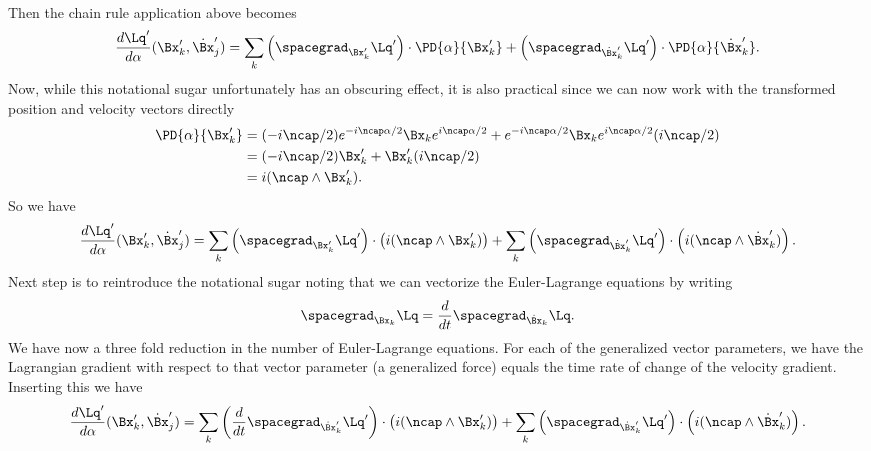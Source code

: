 {\begin{equation}
\begin{aligned}
\end{aligned}
\end{equation}
%
Then the chain rule application above becomes
%
\begin{equation}\label{eqn:goldsteinCh12:420}
\frac{d \Lq'}{d\alpha} (\Bx_k', \dot{\Bx}_j')
= \sum_{k} \left( \spacegrad_{\Bx_k'} \Lq'\right) \cdot \PD{\alpha}{\Bx_k'} + \left( \spacegrad_{\dot{\Bx}_k'} \Lq' \right) \cdot \PD{\alpha}{\dot{\Bx}_k'} .
\end{equation}
%
Now, while this notational sugar unfortunately has an obscuring effect, it is also practical since we can now work with the transformed position
and velocity vectors directly
%
\begin{equation}\label{eqn:goldsteinCh12:440}
\begin{aligned}
\PD{\alpha}{\Bx_k'}
&= (-i \ncap/2) e^{-i\ncap \alpha/2} {\Bx}_k e^{i\ncap\alpha/2} +e^{-i\ncap \alpha/2} {\Bx}_k e^{i\ncap\alpha/2} (i \ncap/2)  \\
&= (-i \ncap/2) \Bx_k' + \Bx_k' (i \ncap/2) \\
&= i (\ncap \wedge \Bx_k').
\end{aligned}
\end{equation}
%
So we have
\begin{equation}\label{eqn:goldsteinCh12:460}
\frac{d \Lq'}{d\alpha} (\Bx_k', \dot{\Bx}_j')
= \sum_{k} \left( \spacegrad_{\Bx_k'} \Lq'\right) \cdot \left( i (\ncap \wedge \Bx_k') \right)
+ \sum_{k} \left( \spacegrad_{\dot{\Bx}_k'} \Lq'\right) \cdot \left( i (\ncap \wedge \dot{\Bx}_k') \right) .
\end{equation}
%
Next step is to reintroduce the notational sugar noting that we can vectorize the Euler-Lagrange equations by writing
%
\begin{equation}\label{eqn:goldsteinCh12:480}
\spacegrad_{\Bx_k} \Lq = \frac{d}{dt} \spacegrad_{\dot{\Bx}_k} \Lq.
\end{equation}
%
We have now a three fold reduction in the number of Euler-Lagrange equations.  For each of the generalized vector parameters, we have the
Lagrangian gradient with respect to that vector parameter (a generalized force) equals the time rate of change of the velocity gradient.
%
Inserting this we have
\begin{equation}\label{eqn:goldsteinCh12:500}
\frac{d \Lq'}{d\alpha} (\Bx_k', \dot{\Bx}_j')
= \sum_{k} \left( \frac{d}{dt} \spacegrad_{\dot{\Bx}_k'} \Lq'\right) \cdot \left( i (\ncap \wedge \Bx_k') \right)
+ \sum_{k} \left( \spacegrad_{\dot{\Bx}_k'} \Lq'\right) \cdot \left( i (\ncap \wedge \dot{\Bx}_k') \right) .

\end{equation}}
